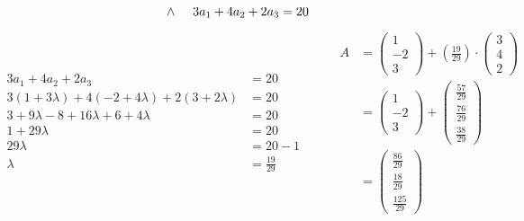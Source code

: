\documentclass{article}
\begin{document}
\begin{enumerate}
\[            \hspace{0.5cm}
            \wedge
            \hspace{0.5cm}
            3a_1 + 4a_2 + 2a_3 = 20
        \]
        \[
            \begin{aligned}
                3a_1 + 4a_2 + 2a_3 &= 20 \\
                3(1 + 3\lambda) + 4(-2 + 4\lambda) + 2(3 + 2\lambda) &= 20 \\
                3 + 9\lambda -8 + 16\lambda + 6 + 4\lambda &= 20 \\
                1 + 29\lambda &= 20 \\
                29\lambda &= 20 - 1\\
                \lambda &= \frac{19}{29}\\
            \end{aligned}
            \hspace{1cm}
            \begin{aligned}
                A &=
                \begin{pmatrix}
                    1 \\ -2 \\ 3
                \end{pmatrix}
                +
                \left(
                    \frac{19}{29}
                \right)
                \cdot
                \begin{pmatrix}
                    3 \\ 4 \\ 2
                \end{pmatrix} \\
                &=
                \begin{pmatrix}
                    1 \\ -2 \\ 3
                \end{pmatrix}
                +
                \begin{pmatrix}
                    \frac{57}{29} \\ \frac{76}{29} \\ \frac{38}{29}
                \end{pmatrix} \\
                &=
                \begin{pmatrix}
                    \frac{86}{29} \\ \frac{18}{29} \\ \frac{125}{29}
                \end{pmatrix} \\

\end{aligned}\]
\end{enumerate}
\end{document}
